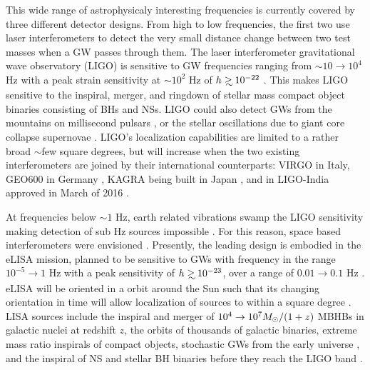 This wide range of astrophysicaly interesting frequencies is currently covered
by three different detector designs. From high to low frequencies, the first
two use laser interferometers to detect the very small distance change between
two test masses when a GW passes through them. The laser interferometer
gravitational wave observatory (LIGO) is sensitive to GW frequencies ranging
from $\sim 10 \rightarrow 10^4$ Hz with a peak strain sensitivity at
$\sim10^{2}$ Hz of $h \gsim 10^{-22}$ \citep{aLIGO:2015}. This makes LIGO
sensitive to the inspiral, merger, and ringdown of stellar mass compact object
binaries consisting of BHs and NSs. LIGO could also detect GWs from the
mountains on millisecond pulsars \citep[\textit{e.g.}][and references therein]{ContWaveLIGO:2016}, 
or the stellar oscillations due to giant core
collapse supernovae \citep[\textit{e.g.}][and references therein]{SNLIGO:2016}.
LIGO's localization capabilities are limited to a rather broad $\sim$few
square degrees, but will increase when the two existing interferometers are
joined by their international counterparts: VIRGO \citep{Acernese:2015} in
Italy, GEO600 in Germany \citep{Dooley:2015}, KAGRA being built in Japan
\citep{Tomaru:2016}, and in LIGO-India approved in March of 2016 \citep{LIGOIndia}.

At frequencies below $\sim 1$ Hz, earth related vibrations swamp the LIGO
sensitivity making detection of sub Hz sources impossible \citep{aLIGO:2015}.
For this reason, space based interferometers were envisioned
\citep{ThorneBraginsky:1976}. Presently, the leading design is embodied in the
eLISA mission, planned to be sensitive to GWs with frequency in the range
$10^{-5} \rightarrow 1$ Hz with a peak sensitivity of $h \gsim 10^{-23}$, over
a range of $0.01 \rightarrow 0.1$ Hz \citep{eLISA:AmaroSeoane:2013}. eLISA
will be oriented in a orbit around the Sun such that its changing orientation
in time will allow localization of sources to within a square degree
\citep{eLISA:AmaroSeoane:2013}. LISA sources include the inspiral and merger
of $10^4 \rightarrow 10^7 {M_{\odot}}/(1+z)$ MBHBs in galactic nuclei at redshift
$z$, the orbits of thousands of galactic binaries, extreme mass ratio
inspirals of compact objects, stochastic GWs from the early universe
\citep{eLISA:AmaroSeoane:2013}, and the inspiral of NS and stellar BH binaries
before they reach the LIGO band  \citep[\textit{e.g.}][and references
therein]{Sesana:LISALIGO:2016}.

